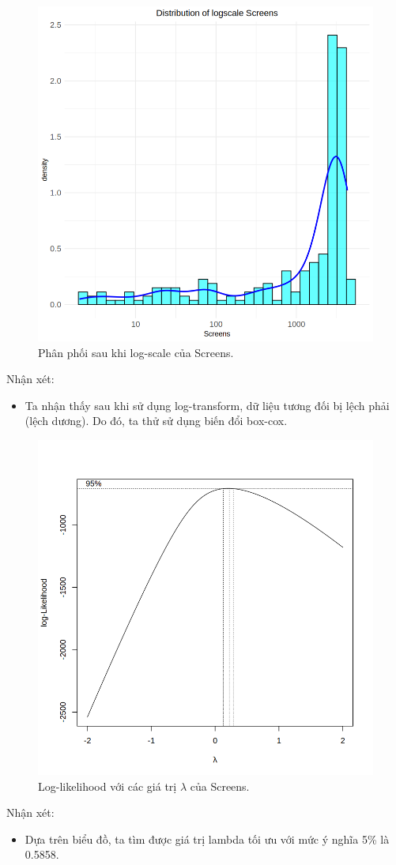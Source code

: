 \begin{figure}[H]
    \centering
    \includegraphics[width=0.75\columnwidth]{csm_figures/screens_logscale_distribution.png}
    \caption{Phân phối sau khi log-scale của Screens.}
    \label{fig:screens_logscale_distribution}
\end{figure}
Nhận xét:
\begin{itemize}
    \item Ta nhận thấy sau khi sử dụng log-transform, dữ liệu tương đối bị lệch phải (lệch dương). Do đó, ta thử sử dụng biến đổi box-cox.
\end{itemize}

\begin{figure}[H]
    \centering
    \includegraphics[width=0.75\columnwidth]{csm_figures/budget_optimal_lambda.png}
    \caption{Log-likelihood với các giá trị $\lambda$ của Screens.}
    \label{fig:screens_optimal_lambda}
\end{figure}
Nhận xét:
\begin{itemize}
    \item Dựa trên biểu đồ, ta tìm được giá trị lambda tối ưu với mức ý nghĩa 5\% là 0.5858.
\end{itemize}


